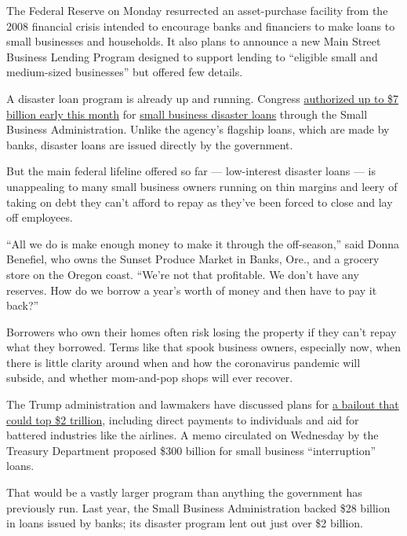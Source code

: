 The Federal Reserve on Monday resurrected an asset-purchase facility
from the 2008 financial crisis intended to encourage banks and
financiers to make loans to small businesses and households. It also
plans to announce a new Main Street Business Lending Program designed to
support lending to ``eligible small and medium-sized businesses'' but
offered few details.

A disaster loan program is already up and running. Congress
\href{https://www.nytimes.com/2020/03/04/us/politics/coronavirus-emergency-aid-congress.html}{authorized
up to \$7 billion early this month} for
\href{https://www.sba.gov/page/coronavirus-covid-19-small-business-guidance-loan-resources\#section-header-0}{small
business disaster loans} through the Small Business Administration.
Unlike the agency's flagship loans, which are made by banks, disaster
loans are issued directly by the government.

But the main federal lifeline offered so far --- low-interest disaster
loans --- is unappealing to many small business owners running on thin
margins and leery of taking on debt they can't afford to repay as
they've been forced to close and lay off employees.

``All we do is make enough money to make it through the off-season,''
said Donna Benefiel, who owns the Sunset Produce Market in Banks, Ore.,
and a grocery store on the Oregon coast. ``We're not that profitable. We
don't have any reserves. How do we borrow a year's worth of money and
then have to pay it back?''

Borrowers who own their homes often risk losing the property if they
can't repay what they borrowed. Terms like that spook business owners,
especially now, when there is little clarity around when and how the
coronavirus pandemic will subside, and whether mom-and-pop shops will
ever recover.

The Trump administration and lawmakers have discussed plans for
\href{https://www.nytimes.com/2020/03/18/business/bailout-economy-coronavirus.html}{a
bailout that could top \$2 trillion}, including direct payments to
individuals and aid for battered industries like the airlines. A memo
circulated on Wednesday by the Treasury Department proposed \$300
billion for small business ``interruption'' loans.

That would be a vastly larger program than anything the government has
previously run. Last year, the Small Business Administration backed \$28
billion in loans issued by banks; its disaster program lent out just
over \$2 billion.

